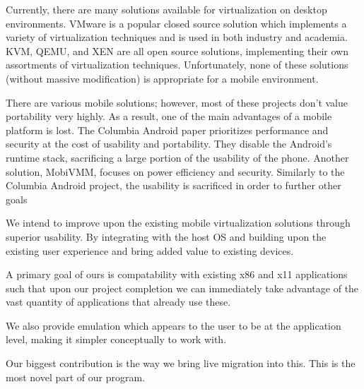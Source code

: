Currently, there are many solutions available for virtualization on desktop environments. VMware is a popular closed source solution which implements a variety of virtualization techniques and is used in both industry and academia. KVM, QEMU, and XEN are all open source solutions, implementing their own assortments of virtualization techniques. Unfortunately, none of these solutions (without massive modification) is appropriate for a mobile environment.

There are various mobile solutions; however, most of these projects don't value portability very highly. As a result, one of the main advantages of a mobile platform is lost. The Columbia Android paper prioritizes performance and security at the cost of usability and portability. They disable the Android's runtime stack, sacrificing a large portion of the usability of the phone. Another solution, MobiVMM, focuses on power efficiency and security. Similarly to the Columbia Android project, the usability is sacrificed in order to further other goals 

We intend to improve upon the existing mobile virtualization solutions through superior usability. By integrating with the host OS and building upon the existing user experience and bring added value to existing devices.

A primary goal of ours is compatability with existing x86 and x11 applications such that upon our project completion we can immediately take advantage of the vast quantity of applications that already use these.

We also provide emulation which appears to the user to be at the application level, making it simpler conceptually to work with.

Our biggest contribution is the way we bring live migration into this. This is the most novel part of our program.
